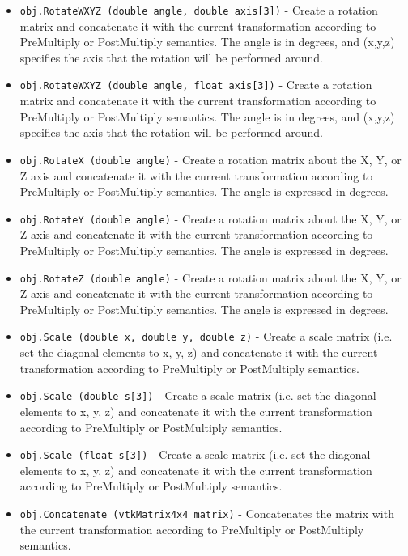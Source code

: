 \begin{itemize}
\item  \verb|obj.RotateWXYZ (double angle, double axis[3])| -  Create a rotation matrix and concatenate it with the current
 transformation according to PreMultiply or PostMultiply semantics.
 The angle is in degrees, and (x,y,z) specifies the axis that the
 rotation will be performed around. 

\item  \verb|obj.RotateWXYZ (double angle, float axis[3])| -  Create a rotation matrix and concatenate it with the current
 transformation according to PreMultiply or PostMultiply semantics.
 The angle is in degrees, and (x,y,z) specifies the axis that the
 rotation will be performed around. 

\item  \verb|obj.RotateX (double angle)| -  Create a rotation matrix about the X, Y, or Z axis and concatenate
 it with the current transformation according to PreMultiply or
 PostMultiply semantics.  The angle is expressed in degrees.

\item  \verb|obj.RotateY (double angle)| -  Create a rotation matrix about the X, Y, or Z axis and concatenate
 it with the current transformation according to PreMultiply or
 PostMultiply semantics.  The angle is expressed in degrees.

\item  \verb|obj.RotateZ (double angle)| -  Create a rotation matrix about the X, Y, or Z axis and concatenate
 it with the current transformation according to PreMultiply or
 PostMultiply semantics.  The angle is expressed in degrees.

\item  \verb|obj.Scale (double x, double y, double z)| -  Create a scale matrix (i.e. set the diagonal elements to x, y, z)
 and concatenate it with the current transformation according to
 PreMultiply or PostMultiply semantics.

\item  \verb|obj.Scale (double s[3])| -  Create a scale matrix (i.e. set the diagonal elements to x, y, z)
 and concatenate it with the current transformation according to
 PreMultiply or PostMultiply semantics.

\item  \verb|obj.Scale (float s[3])| -  Create a scale matrix (i.e. set the diagonal elements to x, y, z)
 and concatenate it with the current transformation according to
 PreMultiply or PostMultiply semantics.

\item  \verb|obj.Concatenate (vtkMatrix4x4 matrix)| -  Concatenates the matrix with the current transformation according
 to PreMultiply or PostMultiply semantics.


\end{itemize}
